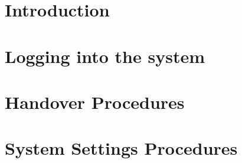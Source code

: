 \documentclass[12pt]{report}
\renewcommand{\footrulewidth}{0.4pt}%
\renewcommand{\headrulewidth}{0pt}%
\begin{document}
 

 
 
  \listoffigures
% 
 
 
  
 \listoftables 
 \tableofcontents
 \chapter{Introduction}
 
% 
% 
% 
  \chapter{Logging into the system}
 
 
 

 
 \chapter{Handover Procedures}
 
 \chapter{System Settings Procedures}
 
 
\end{document}
